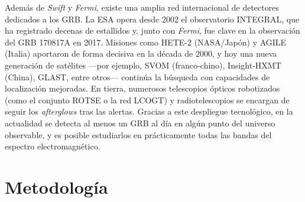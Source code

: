 \documentclass[final,5p,times,twocolumn,authoryear]{elsarticle}
\newcommand{\kms}{km\,s$^{-1}$}
\begin{document}
Además de \textit{Swift} y \textit{Fermi}, existe una amplia red internacional de detectores dedicados a los GRB. La ESA opera desde 2002 el observatorio INTEGRAL, que ha registrado decenas de estallidos y, junto con \textit{Fermi}, fue clave en la observación del GRB 170817A en 2017. \citep{ESAheic1717b} Misiones como HETE-2 (NASA/Japón) y AGILE (Italia) aportaron de forma decisiva en la década de 2000, y hoy una nueva generación de satélites ---por ejemplo, SVOM (franco-chino), Insight-HXMT (China), GLAST, entre otros--- continúa la búsqueda con capacidades de localización mejoradas. En tierra, numerosos telescopios ópticos robotizados (como el conjunto ROTSE o la red LCOGT) y radiotelescopios se encargan de seguir los \textit{afterglows} tras las alertas. Gracias a este despliegue tecnológico, en la actualidad se detecta al menos un GRB al día en algún punto del universo observable, y es posible estudiarlos en prácticamente todas las bandas del espectro electromagnético.\\










\section{Metodología}
\label{metodología}


\end{document}
